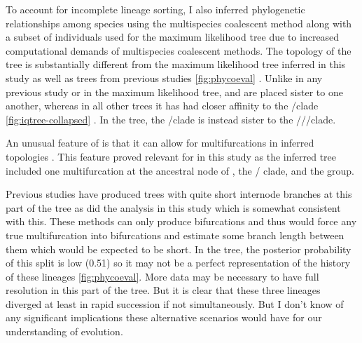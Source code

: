 To account for incomplete lineage sorting, I also inferred phylogenetic     
relationships among \anaxyrus species using the multispecies coalescent 
method \phycoeval along with a subset of individuals used for the maximum likelihood 
tree due to increased computational demands of multispecies coalescent methods. 
The topology of the \phycoeval tree is substantially different from the  
maximum likelihood tree inferred in this study as well as trees from previous 
studies \cref{fig:phycoeval} \parencite{fontenot2011,graybeal1997,masta2002,pramuk2007,pyron2011,portik2023}. 
Unlike in any previous study or in the maximum likelihood tree, \amer and \terr are 
placed sister to one another, whereas in all other trees it has had closer 
affinity to the \hemiophrys/\baxteri clade \cref{fig:iqtree-collapsed} \parencite{pyron2011,portik2023}.
In the \phycoeval tree, the \hemiophrys/\baxteri clade is instead sister
to the \amer/\fowl/\terr/\wood clade.

An unusual feature of \phycoeval is that it can allow for multifurcations in  
inferred topologies \parencite{oaks2022}.
This feature proved relevant for in this study as the inferred tree included
one multifurcation at the ancestral node of \quercicus, the \cognatus/\speciosus
clade, and the \americanus group. 

Previous studies have produced trees with quite short internode branches at this
part of the tree as did the \iqtree analysis in this study which is somewhat 
consistent with this. 
These methods can only produce bifurcations and thus would force any true 
multifurcation into bifurcations and estimate some branch length between them
which would be expected to be short. 
In the \phycoeval tree, the posterior probability of this split is low (0.51) so 
it may not be a perfect representation of the history of these lineages \cref{fig:phycoeval}.
More data may be necessary to have full resolution in this part of the tree.
But it is clear that these three lineages diverged at least in rapid succession
if not simultaneously. 
But I don't know of any significant implications these alternative scenarios would
have for our understanding of \anaxyrus evolution.



